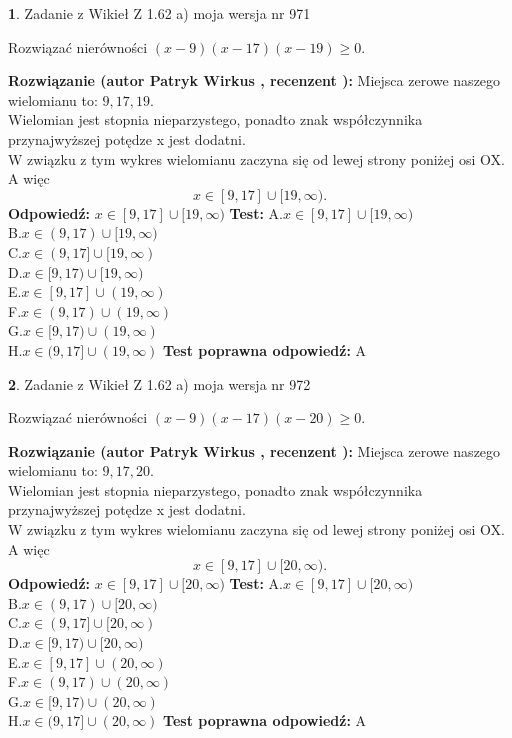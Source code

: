 \documentclass[12pt, a4paper]{article}
\theoremstyle{definition} %
\newtheorem{zad}{}
\newcommand{\zadStart}[1]{\begin{zad}#1\newline}
\newcommand{\zadStop}{\end{zad}}
\newcommand{\rozwStart}[2]{\noindent \textbf{Rozwiązanie (autor #1 , recenzent #2): }\newline}
\newcommand{\rozwStop}{\newline}
\newcommand{\odpStart}{\noindent \textbf{Odpowiedź:}\newline}
\newcommand{\odpStop}{\newline}
\newcommand{\testStart}{\noindent \textbf{Test:}\newline}
\newcommand{\testStop}{\newline}
\newcommand{\kluczStart}{\noindent \textbf{Test poprawna odpowiedź:}\newline}
\newcommand{\kluczStop}{\newline}
\begin{document}
\zadStart{Zadanie z Wikieł Z 1.62 a) moja wersja nr 971}

Rozwiązać nierówności $(x-9)(x-17)(x-19)\ge0$.
\zadStop
\rozwStart{Patryk Wirkus}{}
Miejsca zerowe naszego wielomianu to: $9, 17, 19$.\\
Wielomian jest stopnia nieparzystego, ponadto znak współczynnika przy\linebreak najwyższej potędze x jest dodatni.\\ W związku z tym wykres wielomianu zaczyna się od lewej strony poniżej osi OX. A więc $$x \in [9,17] \cup [19,\infty).$$
\rozwStop
\odpStart
$x \in [9,17] \cup [19,\infty)$
\odpStop
\testStart
A.$x \in [9,17] \cup [19,\infty)$\\
B.$x \in (9,17) \cup [19,\infty)$\\
C.$x \in (9,17] \cup [19,\infty)$\\
D.$x \in [9,17) \cup [19,\infty)$\\
E.$x \in [9,17] \cup (19,\infty)$\\
F.$x \in (9,17) \cup (19,\infty)$\\
G.$x \in [9,17) \cup (19,\infty)$\\
H.$x \in (9,17] \cup (19,\infty)$
\testStop
\kluczStart
A
\kluczStop



\zadStart{Zadanie z Wikieł Z 1.62 a) moja wersja nr 972}

Rozwiązać nierówności $(x-9)(x-17)(x-20)\ge0$.
\zadStop
\rozwStart{Patryk Wirkus}{}
Miejsca zerowe naszego wielomianu to: $9, 17, 20$.\\
Wielomian jest stopnia nieparzystego, ponadto znak współczynnika przy\linebreak najwyższej potędze x jest dodatni.\\ W związku z tym wykres wielomianu zaczyna się od lewej strony poniżej osi OX. A więc $$x \in [9,17] \cup [20,\infty).$$
\rozwStop
\odpStart
$x \in [9,17] \cup [20,\infty)$
\odpStop
\testStart
A.$x \in [9,17] \cup [20,\infty)$\\
B.$x \in (9,17) \cup [20,\infty)$\\
C.$x \in (9,17] \cup [20,\infty)$\\
D.$x \in [9,17) \cup [20,\infty)$\\
E.$x \in [9,17] \cup (20,\infty)$\\
F.$x \in (9,17) \cup (20,\infty)$\\
G.$x \in [9,17) \cup (20,\infty)$\\
H.$x \in (9,17] \cup (20,\infty)$
\testStop
\kluczStart
A
\kluczStop
\end{document}
